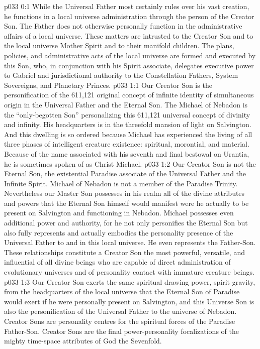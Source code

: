 \author{Chief of Archangels}
\vs p033 0:1 While the Universal Father most certainly rules over his vast creation, he functions in a local universe administration through the person of the Creator Son. The Father does not otherwise personally function in the administrative affairs of a local universe. These matters are intrusted to the Creator Son and to the local universe Mother Spirit and to their manifold children. The plans, policies, and administrative acts of the local universe are formed and executed by this Son, who, in conjunction with his Spirit associate, delegates executive power to Gabriel and jurisdictional authority to the Constellation Fathers, System Sovereigns, and Planetary Princes.
\vs p033 1:1 Our Creator Son is the personification of the 611,121 original concept of infinite identity of simultaneous origin in the Universal Father and the Eternal Son. The Michael of Nebadon is the “only\hyp{}begotten Son” personalizing this 611,121 universal concept of divinity and infinity. His headquarters is in the threefold mansion of light on Salvington. And this dwelling is so ordered because Michael has experienced the living of all three phases of intelligent creature existence: spiritual, morontial, and material. Because of the name associated with his seventh and final bestowal on Urantia, he is sometimes spoken of as Christ Michael.
\vs p033 1:2 Our Creator Son is not the Eternal Son, the existential Paradise associate of the Universal Father and the Infinite Spirit. Michael of Nebadon is not a member of the Paradise Trinity. Nevertheless our Master Son possesses in his realm all of the divine attributes and powers that the Eternal Son himself would manifest were he actually to be present on Salvington and functioning in Nebadon. Michael possesses even additional power and authority, for he not only personifies the Eternal Son but also fully represents and actually embodies the personality presence of the Universal Father to and in this local universe. He even represents the Father\hyp{}Son. These relationships constitute a Creator Son the most powerful, versatile, and influential of all divine beings who are capable of direct administration of evolutionary universes and of personality contact with immature creature beings.
\vs p033 1:3 Our Creator Son exerts the same spiritual drawing power, spirit gravity, from the headquarters of the local universe that the Eternal Son of Paradise would exert if he were personally present on Salvington, and  this Universe Son is also the personification of the Universal Father to the universe of Nebadon. Creator Sons are personality centres for the spiritual forces of the Paradise Father\hyp{}Son. Creator Sons are the final power\hyp{}personality focalizations of the mighty time\hyp{}space attributes of God the Sevenfold.
